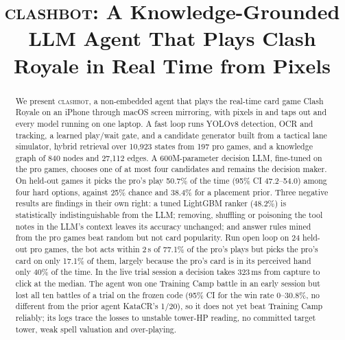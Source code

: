 \documentclass[conference]{IEEEtran}
\newcommand{\cb}{\textsc{clashbot}}
\begin{document}
\title{\cb{}: A Knowledge-Grounded LLM Agent That Plays Clash Royale in Real Time from Pixels}

\author{
}

\maketitle

\begin{abstract}
We present \cb{}, a non-embedded agent that plays the real-time card game Clash Royale on an iPhone through macOS screen mirroring, with pixels in and taps out and every model running on one laptop. A fast loop runs YOLOv8 detection, OCR and tracking, a learned play/wait gate, and a candidate generator built from a tactical lane simulator, hybrid retrieval over 10,923 states from 197 pro games, and a knowledge graph of 840 nodes and 27,112 edges. A 600M-parameter decision LLM, fine-tuned on the pro games, chooses one of at most four candidates and remains the decision maker. On held-out games it picks the pro's play 50.7\% of the time (95\% CI 47.2--54.0) among four hard options, against 25\% chance and 38.4\% for a placement prior. Three negative results are findings in their own right: a tuned LightGBM ranker (48.2\%) is statistically indistinguishable from the LLM; removing, shuffling or poisoning the tool notes in the LLM's context leaves its accuracy unchanged; and answer rules mined from the pro games beat random but not card popularity. Run open loop on 24 held-out pro games, the bot acts within 2\,s of 77.1\% of the pro's plays but picks the pro's card on only 17.1\% of them, largely because the pro's card is in its perceived hand only 40\% of the time. %
In the live trial session a decision takes 323\,ms from capture to click at the median. The agent won one Training Camp battle in an early session but lost all ten battles of a trial on the frozen code (95\% CI for the win rate 0--30.8\%, no different from the prior agent KataCR's 1/20), so it does not yet beat Training Camp reliably; its logs trace the losses to unstable tower-HP reading, no committed target tower, weak spell valuation and over-playing. %
\end{abstract}
\end{document}
